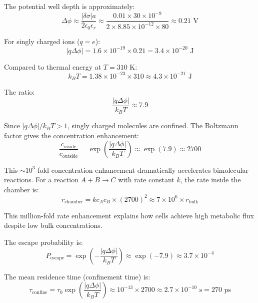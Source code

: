 \documentclass[twocolumn,10pt,aps,prd,superscriptaddress,floatfix,nofootinbib]{revtex4-2}
\theoremstyle{remark}
\begin{document}
The potential well depth is approximately:
\begin{equation}
\Delta\phi \approx \frac{|\delta\sigma| a}{2\epsilon_0\epsilon_r} \approx \frac{0.01 \times 30 \times 10^{-9}}{2 \times 8.85 \times 10^{-12} \times 80} \approx 0.21 \text{ V}
\end{equation}

For singly charged ions ($q = e$):
\begin{equation}
|q\Delta\phi| = 1.6 \times 10^{-19} \times 0.21 = 3.4 \times 10^{-20} \text{ J}
\end{equation}

Compared to thermal energy at $T = 310$ K:
\begin{equation}
k_B T = 1.38 \times 10^{-23} \times 310 \approx 4.3 \times 10^{-21} \text{ J}
\end{equation}

The ratio:
\begin{equation}
\frac{|q\Delta\phi|}{k_B T} \approx 7.9
\end{equation}

Since $|q\Delta\phi|/k_B T > 1$, singly charged molecules are confined. The Boltzmann factor gives the concentration enhancement:
\begin{equation}
\frac{c_{\mathrm{inside}}}{c_{\mathrm{outside}}} = \exp\left(\frac{|q\Delta\phi|}{k_B T}\right) \approx \exp(7.9) \approx 2700
\end{equation}

This $\sim 10^3$-fold concentration enhancement dramatically accelerates bimolecular reactions. For a reaction $A + B \rightarrow C$ with rate constant $k$, the rate inside the chamber is:
\begin{equation}
r_{\mathrm{chamber}} = k c_A c_B \times (2700)^2 \approx 7 \times 10^{6} \times r_{\mathrm{bulk}}
\end{equation}

This million-fold rate enhancement explains how cells achieve high metabolic flux despite low bulk concentrations.

The escape probability is:
\begin{equation}
P_{\mathrm{escape}} = \exp\left(-\frac{|q\Delta\phi|}{k_B T}\right) \approx \exp(-7.9) \approx 3.7 \times 10^{-4}
\end{equation}

The mean residence time (confinement time) is:
\begin{equation}
\tau_{\mathrm{confine}} = \tau_0 \exp\left(\frac{|q\Delta\phi|}{k_B T}\right) \approx 10^{-13} \times 2700 \approx 2.7 \times 10^{-10} \text{ s} = 270 \text{ ps}
\end{equation}
\end{document}
